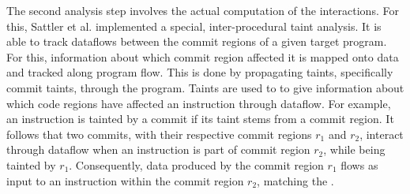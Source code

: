 The second analysis step involves the actual computation of the interactions.
For this, Sattler et al. implemented a special, inter-procedural taint analysis.
It is able to track dataflows between the commit regions of a given target program.
For this, information about which commit region affected it is mapped onto data and tracked along program flow.
This is done by propagating taints, specifically commit taints, through the program.
Taints are used to to give information about which code regions have affected an instruction through dataflow.
For example, an instruction is tainted by a commit if its taint stems from a commit region.
It follows that two commits, with their respective commit regions $r_1$ and $r_2$, interact through dataflow when an instruction is part of commit region $r_2$, while being tainted by $r_1$.
Consequently, data produced by the commit region $r_1$ flows as input to an instruction within the commit region $r_2$, matching the \lowercase{}.
